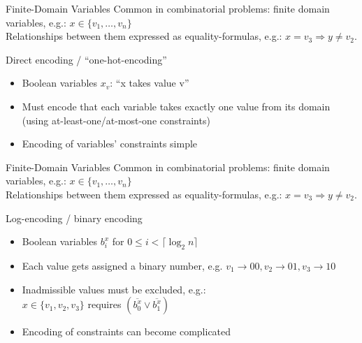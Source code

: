 \documentclass[t]{sdqbeamer}
\begin{document}
\begin{frame}{Finite-Domain Variables}
	Common in combinatorial problems: finite domain variables, e.g.: $x \in \{ v_1, \dots, v_n \}$\\
	Relationships between them expressed as equality-formulas, e.g.: $x = v_3 \Rightarrow y \neq v_2$.
	\begin{block}{Direct encoding / ``one-hot-encoding''}
		\begin{itemize}
		\item Boolean variables $x_v$: ``x takes value v''
		\item Must encode that each variable takes exactly one value from its domain
			(using at-least-one/at-most-one constraints)
		\item Encoding of variables' constraints simple
		\end{itemize}
	\end{block}
\end{frame}
\begin{frame}{Finite-Domain Variables}
	Common in combinatorial problems: finite domain variables, e.g.: $x \in \{ v_1, \dots, v_n \}$\\
	Relationships between them expressed as equality-formulas, e.g.: $x = v_3 \Rightarrow y \neq v_2$.
	\begin{block}{Log-encoding / binary encoding}
		\begin{itemize}
		\item Boolean variables $b^x_i$ for $0 \leq i < \lceil \log_2{n} \rceil$
		\item Each value gets assigned a binary number, e.g. $v_1 \rightarrow 00, v_2 \rightarrow 01, v_3 \rightarrow 10$
		\item Inadmissible values must be excluded, e.g.: \\
			$x \in \{ v_1, v_2, v_3 \}$ requires $(\overline{b^x_0} \lor \overline{b^x_1})$
		\item Encoding of constraints can become complicated
		\end{itemize}
	\end{block}
\end{frame}
\end{document}
